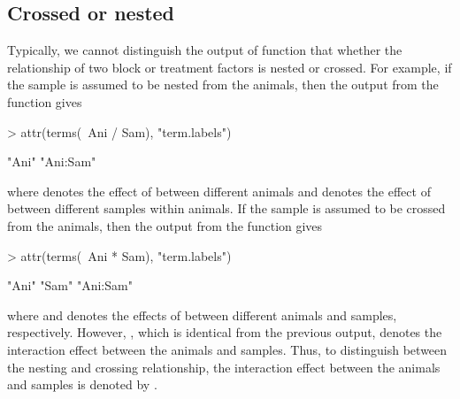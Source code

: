 \documentclass[article]{jss}
\begin{document}
\subsection{Crossed or nested}
Typically, we cannot distinguish the output of  function  that whether the relationship of two block or treatment factors is nested or crossed. For example, if the sample is assumed to be nested from the animals, then the output from the  function gives
\begin{CodeChunk}
\begin{CodeInput}
> attr(terms(~Ani / Sam), "term.labels")
\end{CodeInput}
\begin{CodeOutput}
[1] "Ani"     "Ani:Sam"
\end{CodeOutput}
\end{CodeChunk}
where  denotes the effect of between different animals and  denotes the effect of between different samples within animals. If the sample is assumed to be crossed from the animals, then the output from the  function gives
\begin{CodeChunk}
\begin{CodeInput}
> attr(terms(~Ani * Sam), "term.labels")
\end{CodeInput}
\begin{CodeOutput}
[1] "Ani"     "Sam"     "Ani:Sam"
\end{CodeOutput}
\end{CodeChunk}
where  and  denotes the effects of between different animals and samples, respectively. However, , which is identical from the previous output, denotes the interaction effect between the animals and samples. Thus, to distinguish between the nesting and crossing relationship, the interaction effect between the animals and samples is denoted by . 
\end{document}
